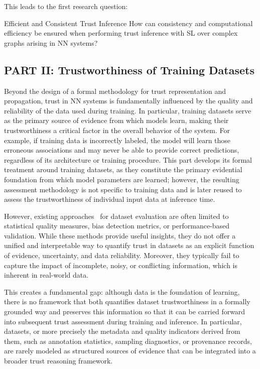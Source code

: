 This leads to the first research question:
\begin{rqbox}{Efficient and Consistent Trust Inference}
\label{rq:1}
    How can consistency and computational efficiency be ensured when performing trust inference with \ac{SL} over complex graphs arising in \ac{NN} systems?
\end{rqbox}

\subsection{PART II: Trustworthiness of Training Datasets}
Beyond the design of a formal methodology for trust representation and propagation, trust in \ac{NN} systems is fundamentally influenced by the quality and reliability of the data used during training. In particular, training datasets serve as the primary source of evidence from which models learn, making their trustworthiness a critical factor in the overall behavior of the system. For example, if training data is incorrectly labeled, the model will learn those erroneous associations and may never be able to provide correct predictions, regardless of its architecture or training procedure. This part develops its formal treatment around training datasets, as they constitute the primary evidential foundation from which model parameters are learned; however, the resulting assessment methodology is not specific to training data and is later reused to assess the trustworthiness of individual input data at inference time.

However, existing approaches~\cite{gebru2018datasheets, schwabe2024metric} for dataset evaluation are often limited to statistical quality measures, bias detection metrics, or performance-based validation. While these methods provide useful insights, they do not offer a unified and interpretable way to quantify trust in datasets as an explicit function of evidence, uncertainty, and data reliability. Moreover, they typically fail to capture the impact of incomplete, noisy, or conflicting information, which is inherent in real-world data.

This creates a fundamental gap: although data is the foundation of learning, there is no framework that both quantifies dataset trustworthiness in a formally grounded way and preserves this information so that it can be carried forward into subsequent trust assessment during training and inference. In particular, datasets, or more precisely the metadata and quality indicators derived from them, such as annotation statistics, sampling diagnostics, or provenance records, are rarely modeled as structured sources of evidence that can be integrated into a broader trust reasoning framework.

